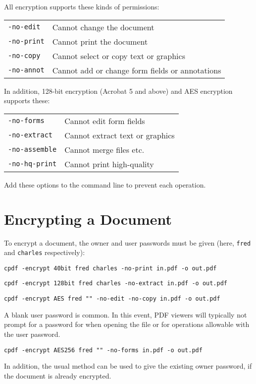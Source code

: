 \documentclass{book}
\begin{document}
   \vspace{2mm}
   \noindent All encryption supports these kinds of permissions:

   \vspace{2mm}
   \begin{tabular}{ll}
     \texttt{-no-edit} & Cannot change the document\\
     \texttt{-no-print} & Cannot print the document\\
     \texttt{-no-copy} & Cannot select or copy text or graphics\\
     \texttt{-no-annot} & Cannot add or change form fields or annotations\\
   \end{tabular}

   \vspace{2mm}
   \noindent In addition, 128-bit encryption (Acrobat 5 and above) and AES encryption supports these:

   \vspace{2mm}
   \begin{tabular}{ll}
     \texttt{-no-forms} & Cannot edit form fields\\
     \texttt{-no-extract} & Cannot extract text or graphics\\
     \texttt{-no-assemble} & Cannot merge files etc.\\
     \texttt{-no-hq-print} & Cannot print high-quality\\
   \end{tabular}

  \vspace{2mm}
  \noindent Add these options to the command line to prevent each operation.

  \vspace{2mm}

  \section{Encrypting a Document}
  To encrypt a document, the owner and user passwords must be given (here, \texttt{fred} and \texttt{charles} respectively):
  \begin{framed}
    \small\verb!cpdf -encrypt 40bit fred charles -no-print in.pdf -o out.pdf!

    \vspace{1.5mm}
    \small\verb!cpdf -encrypt 128bit fred charles -no-extract in.pdf -o out.pdf!

    \vspace{1.5mm}
    \small\verb!cpdf -encrypt AES fred "" -no-edit -no-copy in.pdf -o out.pdf!
  \end{framed}
  \noindent A blank user password is
common. In this event, PDF viewers will typically not prompt for a
password for when opening the file or for operations allowable with the user password.
  \begin{framed}
    \vspace{1.5mm}
    \small\verb!cpdf -encrypt AES256 fred "" -no-forms in.pdf -o out.pdf!
  \end{framed}
\noindent In addition, the usual method can be used to give the existing owner
password, if the document is already encrypted.
\end{document}
